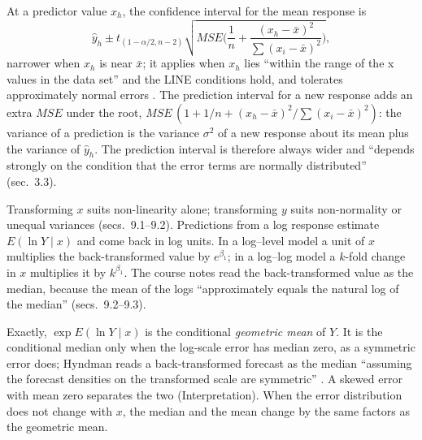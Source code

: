 \begin{qfmethod}\label{meth:regression-prediction-functional-form}
 At a predictor value $x_h$, the confidence interval for the mean response is
\[ \hat y_h\pm t_{(1-\alpha/2,n-2)}\sqrt{MSE\Big(\frac1n+\frac{(x_h-\bar x)^2}{\sum(x_i-\bar x)^2}\Big)}, \]
narrower when $x_h$ is near $\bar x$; it applies when $x_h$ lies ``within the range of the x values in the data set'' and the LINE conditions hold, and tolerates approximately normal errors \citep[sec.~3.2]{regression-methods-course-notes}. The prediction interval for a new response adds an extra $MSE$ under the root, $MSE\,(1+1/n+(x_h-\bar x)^2/\sum(x_i-\bar x)^2)$: the variance of a prediction is the variance $\sigma^2$ of a new response about its mean plus the variance of $\hat y_h$. The prediction interval is therefore always wider and ``depends strongly on the condition that the error terms are normally distributed'' (sec.~3.3).

Transforming $x$ suits non-linearity alone; transforming $y$ suits non-normality or unequal variances (secs.~9.1--9.2). Predictions from a log response estimate $E(\ln Y\mid x)$ and come back in log units. In a log--level model a unit of $x$ multiplies the back-transformed value by $e^{\beta_1}$; in a log--log model a $k$-fold change in $x$ multiplies it by $k^{\beta_1}$. The course notes read the back-transformed value as the median, because the mean of the logs ``approximately equals the natural log of the median'' (secs.~9.2--9.3).

Exactly, $\exp E(\ln Y\mid x)$ is the conditional \emph{geometric mean} of $Y$. It is the conditional median only when the log-scale error has median zero, as a symmetric error does; Hyndman reads a back-transformed forecast as the median ``assuming the forecast densities on the transformed scale are symmetric'' \citep[para.~1]{back-transformed-forecast-mean-2014}. A skewed error with mean zero separates the two (Interpretation). When the error distribution does not change with $x$, the median and the mean change by the same factors as the geometric mean.


\end{qfmethod}
